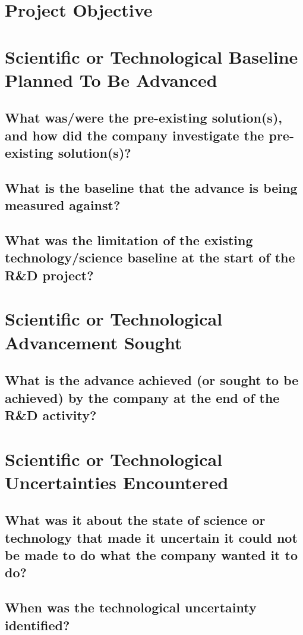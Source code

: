 \documentclass[11pt,a4paper]{article}
\begin{document}
\section{Project Objective}

\section{Scientific or Technological Baseline Planned To Be Advanced}
\subsection{What was/were the pre-existing solution(s), and how did the company investigate the pre-existing solution(s)?}


\subsection{What is the baseline that the advance is being measured against?}

\subsection{What was the limitation of the existing technology/science baseline at the start of the R\&D project?}

\section{Scientific or Technological Advancement Sought}
\subsection{What is the advance achieved (or sought to be achieved) by the company at the end of the R\&D activity?}

\section{Scientific or Technological Uncertainties Encountered}
\subsection{What was it about the state of science or technology that made it uncertain it could not be made to do what the company wanted it to do?}

\subsection{When was the technological uncertainty identified?}
\end{document}
